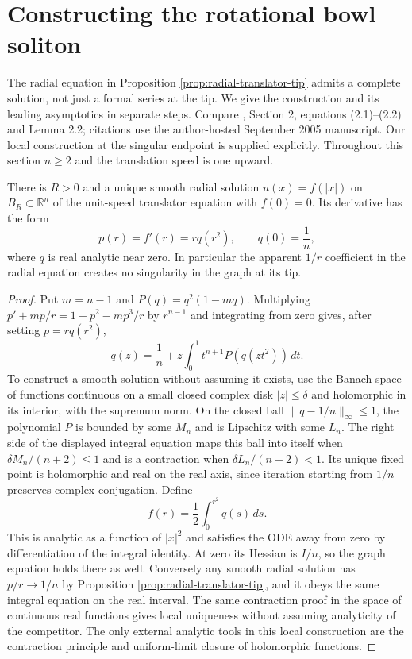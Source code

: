 \chapter{Constructing the rotational bowl soliton}\label{sec:examples-bowl}
The radial equation in Proposition \ref{prop:radial-translator-tip} admits a complete solution, not just a formal series at the tip. We give the construction and its leading asymptotics in separate steps. Compare \cite{CSS07}, Section 2, equations (2.1)--(2.2) and Lemma 2.2; citations use the author-hosted September 2005 manuscript. Our local construction at the singular endpoint is supplied explicitly. Throughout this section $n\geq2$ and the translation speed is one upward.

\begin{lemma}\label{lem:bowl-smooth-tip-existence}
There is $R>0$ and a unique smooth radial solution $u(x)=f(|x|)$ on $B_R\subset\mathbb R^n$ of the unit-speed translator equation with $f(0)=0$. Its derivative has the form
\[
 p(r)=f'(r)=rq(r^2),\qquad q(0)=\frac1n,
\]
where $q$ is real analytic near zero. In particular the apparent $1/r$ coefficient in the radial equation creates no singularity in the graph at its tip.
\end{lemma}
\begin{proof}
Put $m=n-1$ and $P(q)=q^2(1-mq)$. Multiplying $p'+mp/r=1+p^2-mp^3/r$ by $r^{n-1}$ and integrating from zero gives, after setting $p=rq(r^2)$,
\[
 q(z)=\frac1n+z\int_0^1t^{n+1}P(q(zt^2))\,dt.
\]
To construct a smooth solution without assuming it exists, use the Banach space of functions continuous on a small closed complex disk $|z|\leq\delta$ and holomorphic in its interior, with the supremum norm. On the closed ball $\|q-1/n\|_\infty\leq1$, the polynomial $P$ is bounded by some $M_n$ and is Lipschitz with some $L_n$. The right side of the displayed integral equation maps this ball into itself when $\delta M_n/(n+2)\leq1$ and is a contraction when $\delta L_n/(n+2)<1$. Its unique fixed point is holomorphic and real on the real axis, since iteration starting from $1/n$ preserves complex conjugation. Define
\[
 f(r)=\frac12\int_0^{r^2}q(s)\,ds.
\]
This is analytic as a function of $|x|^2$ and satisfies the ODE away from zero by differentiation of the integral identity. At zero its Hessian is $I/n$, so the graph equation holds there as well. Conversely any smooth radial solution has $p/r\to1/n$ by Proposition \ref{prop:radial-translator-tip}, and it obeys the same integral equation on the real interval. The same contraction proof in the space of continuous real functions gives local uniqueness without assuming analyticity of the competitor. The only external analytic tools in this local construction are the contraction principle and uniform-limit closure of holomorphic functions.
\end{proof}

